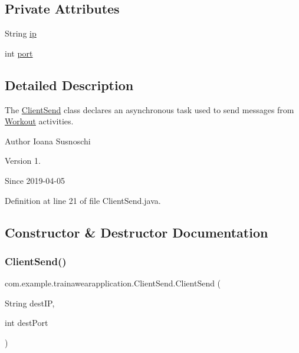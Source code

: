 \subsection*{Private Attributes}
\begin{DoxyCompactItemize}
\item 
String \mbox{\hyperlink{classcom_1_1example_1_1trainawearapplication_1_1_client_send_ad35299d12486a041cdcbcffab3cc320f}{ip}}
\item 
int \mbox{\hyperlink{classcom_1_1example_1_1trainawearapplication_1_1_client_send_a1295f5916c4527127a9dd68b7c6fe759}{port}}
\end{DoxyCompactItemize}


\subsection{Detailed Description}
The \mbox{\hyperlink{classcom_1_1example_1_1trainawearapplication_1_1_client_send}{Client\+Send}} class declares an asynchronous task used to send messages from \mbox{\hyperlink{classcom_1_1example_1_1trainawearapplication_1_1_workout}{Workout}} activities. 

\begin{DoxyAuthor}{Author}
Ioana Susnoschi 
\end{DoxyAuthor}
\begin{DoxyVersion}{Version}
1. 
\end{DoxyVersion}
\begin{DoxySince}{Since}
2019-\/04-\/05 
\end{DoxySince}


Definition at line 21 of file Client\+Send.\+java.



\subsection{Constructor \& Destructor Documentation}
\mbox{\label{classcom_1_1example_1_1trainawearapplication_1_1_client_send_ab1f011085d4305f586a7074a46e73450}} 
\subsubsection{\texorpdfstring{ClientSend()}{ClientSend()}}
{\footnotesize\ttfamily com.\+example.\+trainawearapplication.\+Client\+Send.\+Client\+Send (\begin{DoxyParamCaption}\item[{String}]{dest\+IP,  }\item[{int}]{dest\+Port }\end{DoxyParamCaption})\hspace{0.3cm}{\ttfamily [inline]}}



